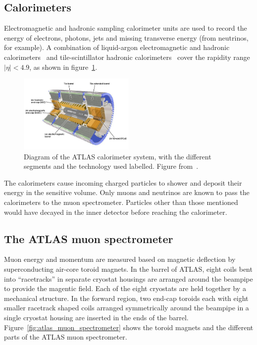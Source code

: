 \subsection{Calorimeters}
Electromagnetic and hadronic sampling calorimeter units are used to record the energy of electrons, photons, jets and missing transverse energy (from neutrinos, for example). A combination of liquid-argon electromagnetic and hadronic calorimeters~\cite{atlas_lar_cal_tdr} and tile-scintillator hadronic calorimeters~\cite{atlas_tile_cal_tdr} cover the rapidity range $|\eta| < 4.9$, as shown in figure~\ref{fig:atlas_calorimeter}.

\begin{figure}
    \centering
    \includegraphics[width = 0.5\textwidth]{figures/atlas_calorimeter.png}
    \caption{Diagram of the ATLAS calorimeter system, with the different segments and the technology used labelled. Figure from~\cite{collaboration_atlas_2008}.}
    \label{fig:atlas_calorimeter}
\end{figure}

The calorimeters cause incoming charged particles to shower and deposit their energy in the sensitive volume. Only muons and neutrinos are known to pass the calorimeters to the muon spectrometer.  Particles other than those mentioned would have decayed in the inner detector before reaching the calorimeter. 

\subsection{The ATLAS muon spectrometer}

Muon energy and momentum are measured based on magnetic deflection by superconducting air-core toroid magnets. In the barrel of ATLAS, eight coils bent into ``racetracks'' in separate cryostat housings are arranged around the beampipe to provide the magentic field. Each of the eight cryostats are held together by a mechanical structure. In the forward region, two end-cap toroids each with eight smaller racetrack shaped coils arranged symmetrically around the beampipe in a single cryostat housing are inserted in the ends of the barrel. Figure~\ref{fig:atlas_muon_spectrometer} shows the toroid magnets and the different parts of the ATLAS muon spectrometer.

